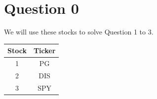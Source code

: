 \documentclass[12pt,letterpaper]{article}
\begin{document}
\section*{Question 0}
We will use these stocks to solve Question 1 to 3.

\begin{table}[ht]
\centering %
\begin{tabular}{c c} %
\hline\hline %
Stock & Ticker\\ [0.5ex] %
\hline %
1 & PG \\ %
2 & DIS \\ %
3 & SPY \\
\hline %
\end{tabular}
\end{table}
\vspace{-6mm}
\end{document}
